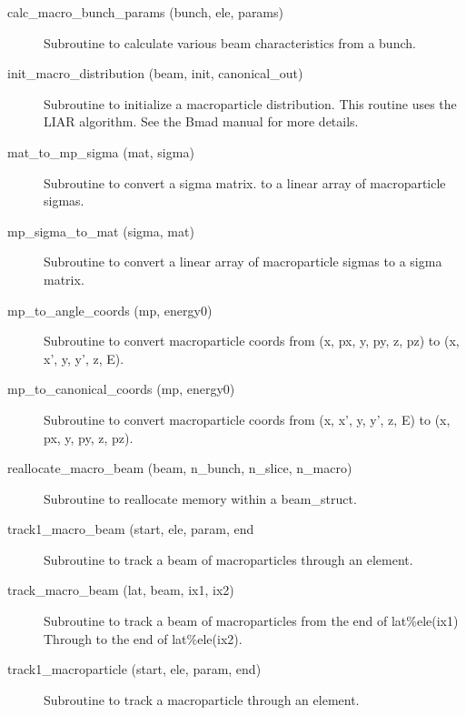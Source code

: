 \begin{description}

\label{r:calc.macro.bunch.params}
\item[calc_macro_bunch_params (bunch, ele, params)] \Newline
Subroutine to calculate various beam characteristics from a bunch.

\label{r:init.macro.distribution}
\item[init_macro_distribution (beam, init, canonical_out)] \Newline 
Subroutine to initialize a macroparticle distribution.
This routine uses the LIAR algorithm. See the Bmad manual for more details.

\label{r:mat.to.mp.sigma}
\item[mat_to_mp_sigma (mat, sigma)] \Newline 
Subroutine to convert a sigma matrix. to a linear array of 
macroparticle sigmas.

\label{r:mp.sigma.to.mat}
\item[mp_sigma_to_mat (sigma, mat)] \Newline 
Subroutine to convert a linear array of macroparticle sigmas to a 
sigma matrix. 

\label{r:mp.to.angle.coords}
\item[mp_to_angle_coords (mp, energy0)] \Newline 
Subroutine to convert macroparticle coords from 
(x, px, y, py, z, pz) to (x, x', y, y', z, E).

\label{r:mp.to.canonical.coords}
\item[mp_to_canonical_coords (mp, energy0)] \Newline 
Subroutine to convert macroparticle coords from 
(x, x', y, y', z, E) to (x, px, y, py, z, pz).

\label{r:reallocate.macro.beam}
\item[reallocate_macro_beam (beam, n_bunch, n_slice, n_macro)] \Newline 
Subroutine to reallocate memory within a beam_struct.

\label{r:track1.macro.beam}
\item[track1_macro_beam (start, ele, param, end] \Newline
Subroutine to track a beam of macroparticles through an element.

\label{r:track.macro.beam}
\item[track_macro_beam (lat, beam, ix1, ix2)] \Newline 
Subroutine to track a beam of macroparticles from the end of
lat\%ele(ix1) Through to the end of lat\%ele(ix2).

\label{r:track1.macroparticle}
\item[track1_macroparticle (start, ele, param, end)] \Newline 
Subroutine to track a macroparticle through an element.

\end{description}

